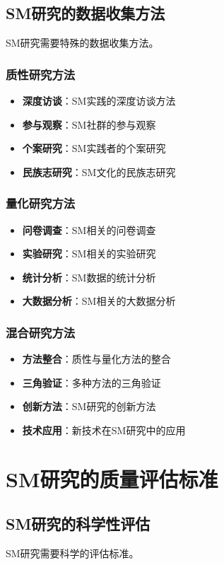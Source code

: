 \documentclass[12pt,UTF8]{ctexbook}
\begin{document}
\section{SM研究的数据收集方法}
SM研究需要特殊的数据收集方法。

\subsection{质性研究方法}
\begin{itemize}[leftmargin=2cm]
	\item \textbf{深度访谈}：SM实践的深度访谈方法
	\item \textbf{参与观察}：SM社群的参与观察
	\item \textbf{个案研究}：SM实践者的个案研究
	\item \textbf{民族志研究}：SM文化的民族志研究
\end{itemize}

\subsection{量化研究方法}
\begin{itemize}[leftmargin=2cm]
	\item \textbf{问卷调查}：SM相关的问卷调查
	\item \textbf{实验研究}：SM相关的实验研究
	\item \textbf{统计分析}：SM数据的统计分析
	\item \textbf{大数据分析}：SM相关的大数据分析
\end{itemize}

\subsection{混合研究方法}
\begin{itemize}[leftmargin=2cm]
	\item \textbf{方法整合}：质性与量化方法的整合
	\item \textbf{三角验证}：多种方法的三角验证
	\item \textbf{创新方法}：SM研究的创新方法
	\item \textbf{技术应用}：新技术在SM研究中的应用
\end{itemize}

\chapter{SM研究的质量评估标准}
\section{SM研究的科学性评估}
SM研究需要科学的评估标准。
\end{document}
